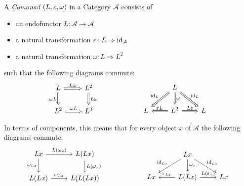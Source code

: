 \begin{definition}[Comonad]
A \textit{Comonad} $(L,\varepsilon, \omega) $ in a Category $\mathcal{A}$ consists of
\begin{itemize}
    \item an endofunctor $L\colon \mathcal{A} \to \mathcal{A}$
    \item a natural transformation $\varepsilon \colon L \Rightarrow \operatorname{id}_{\mathcal{A}}$ 
    \item a natural transformation $\omega\colon L \Rightarrow L^2 $
\end{itemize}  
such that the following diagrams commute:
\begin{equation} \label{eq: def comonad}
    \begin{tikzcd}
        L \ar[r,"L\omega",Rightarrow] \ar[d,"\omega L"',Rightarrow] 
            & L^2 \ar[d,"L\omega",Rightarrow] \\
        L^2 \ar[r,"\omega L",Rightarrow]
            & L^3
    \end{tikzcd}
    \qqq 
    \begin{tikzcd} 
        & L \ar[ld,"\id_L"',Rightarrow] 
        \ar[rd,"\id_L",Rightarrow] \ar[d,"\omega",Rightarrow] & \\
        L 
        & L^2 \ar[l,"\eps L"',Rightarrow] \ar[r,"L \eps",Rightarrow] 
        & L
    \end{tikzcd}
\end{equation}

In terms of components, this means that for every object $x$ of $\mathcal{A}$
the following diagrams commute:
\begin{equation} \label{eq: def comonad in components}
    \begin{tikzcd}
        Lx \ar[r,"L(\omega_x)"] \ar[d,"\omega_{Lx}"'] 
            & L(Lx) \ar[d,"L(\omega_x)"] \\
        L(Lx) \ar[r,"\omega_{Lx}"]
            & L(L(Lx))
    \end{tikzcd}
    \qqq 
    \begin{tikzcd}
        & Lx \ar[ld,"\id_{Lx}"'] 
        \ar[rd,"\id_{Lx}"] \ar[d,"\omega_x"] & \\
        Lx 
        & L(Lx) \ar[l,"\eps_{Lx}"'] \ar[r,"L(\eps_x)"] 
        & Lx
    \end{tikzcd}
\end{equation}

\end{definition}


